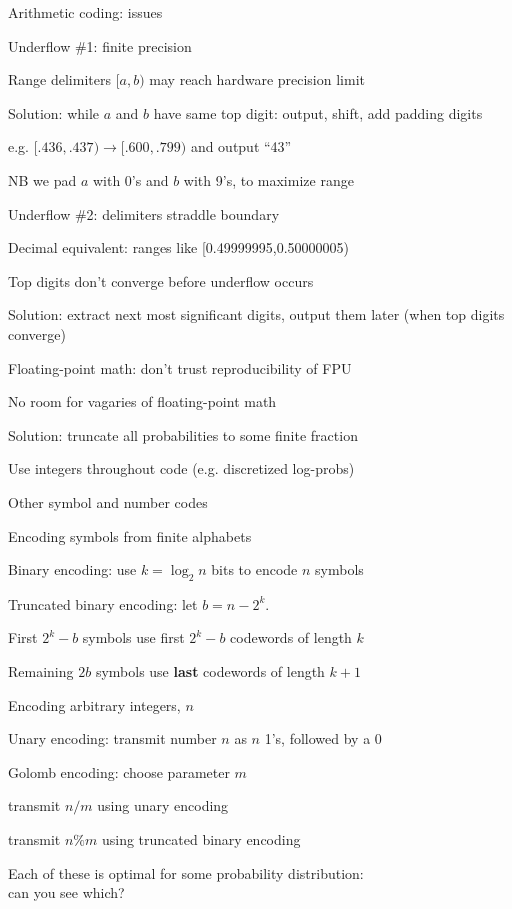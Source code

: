 \documentclass{beamer}
\begin{document}
\begin{frame}{Arithmetic coding: issues}

\itemb
\item \alert{Underflow \#1:} finite precision
 \itemb
 \item Range delimiters $[a,b)$ may reach hardware precision limit
 \item Solution: while $a$ and $b$ have same top digit: output, shift, add padding digits
 \itemb
  \item e.g. $[.436,.437) \to [.600, .799)$ and output ``43''
  \item NB we pad $a$ with 0's and $b$ with 9's, to maximize range
 \iteme
 \iteme
\pause
\item \alert{Underflow \#2:} delimiters straddle boundary
 \itemb
 \item Decimal equivalent: ranges like [0.49999995,0.50000005)
 \item Top digits don't converge before underflow occurs
 \item Solution: extract next most significant digits, output them later (when top digits converge)
 \iteme
\pause
\item \alert{Floating-point math:} don't trust reproducibility of FPU
 \itemb
 \item No room for vagaries of floating-point math
 \item Solution: truncate all probabilities to some finite fraction
 \item Use integers throughout code (e.g. discretized log-probs)
 \iteme
\iteme

\end{frame}


\begin{frame}{Other symbol and number codes}

\itemb
\item Encoding symbols from finite alphabets
 \itemb
  \item \alert{Binary encoding}: use $k=\log_2 n$ bits to encode $n$ symbols
  \item \alert{Truncated binary encoding}: let $b = n - 2^k$.
  \itemb
   \item First $2^k - b$ symbols use first $2^k - b$ codewords of length $k$
   \item Remaining $2b$ symbols use {\bf last} codewords of length $k+1$
  \iteme
 \iteme
\item Encoding arbitrary integers, $n$
 \itemb
  \item \alert{Unary encoding}: transmit number $n$ as $n$ 1's, followed by a 0
  \item \alert{Golomb encoding}: choose parameter $m$
   \itemb
   \item transmit $n/m$ using unary encoding
   \item transmit $n\%m$ using truncated binary encoding
   \iteme
 \iteme
\iteme

Each of these is optimal for some probability distribution: \\
\alert{can you see which?}

\end{frame}
\end{document}
